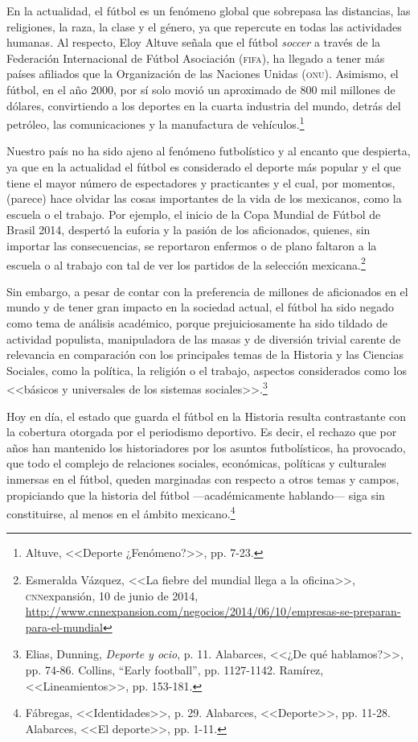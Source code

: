 \documentclass[11pt,a5paper,twoside]{book} %
\begin{document}
\noindent En la actualidad, el fútbol es un fenómeno global que sobrepasa las distancias, las religiones, la raza, la clase y el género, ya que repercute en todas las actividades humanas. Al respecto, Eloy Altuve señala que el fútbol \emph{soccer} a través de la Federación Internacional de Fútbol Asociación (\textsc{fifa}), ha llegado a tener más países afiliados que la Organización de las Naciones Unidas (\textsc{onu}). Asimismo, el fútbol, en el año 2000, por sí solo movió un aproximado de 800 mil millones de dólares, convirtiendo a los deportes en la cuarta industria del mundo, detrás del petróleo, las comunicaciones y la manufactura de vehículos.\footnote{Altuve, <<Deporte ¿Fenómeno?>>, pp. 7-23.}

Nuestro país no ha sido ajeno al fenómeno futbolístico y al encanto que despierta, ya que en la actualidad el fútbol es considerado el deporte más popular y el que tiene el mayor número de espectadores y practicantes y el cual, por momentos, (parece) hace olvidar las cosas importantes de la vida de los mexicanos, como la escuela o el trabajo. Por ejemplo, el inicio de la Copa Mundial de Fútbol de Brasil 2014, despertó la euforia y la pasión de los aficionados, quienes, sin importar las consecuencias, se reportaron enfermos o de plano faltaron a la escuela o al trabajo con tal de ver los partidos de la selección mexicana.\footnote{Esmeralda Vázquez, <<La fiebre del mundial llega a la oficina>>, \textsc{cnn}expansión, 10 de junio de 2014, \url{http://www.cnnexpansion.com/negocios/2014/06/10/empresas-se-preparan-para-el-mundial}}

Sin embargo, a pesar de contar con la preferencia de millones de aficionados en el mundo y de tener gran impacto en la sociedad actual, el fútbol ha sido negado como tema de análisis académico, porque prejuiciosamente ha sido tildado de actividad populista, manipuladora de las masas y de diversión trivial carente de relevancia en comparación con los principales temas de la Historia y las Ciencias Sociales, como la política, la religión o el trabajo, aspectos considerados como los <<básicos y universales de los sistemas sociales>>.\footnote{Elias, Dunning, \emph{Deporte y ocio}, p. 11. Alabarces, <<¿De qué hablamos?>>, pp. 74-86. Collins, ``Early football'',
pp. 1127-1142. Ramírez, <<Lineamientos>>, pp. 153-181.}

Hoy en día, el estado que guarda el fútbol en la Historia resulta contrastante con la cobertura otorgada por el periodismo deportivo. Es decir, el rechazo que por años han mantenido los historiadores por los asuntos futbolísticos, ha provocado, que todo el complejo de relaciones sociales, económicas, políticas y culturales inmersas en el fútbol, queden marginadas con respecto a otros temas y campos, propiciando que la historia del fútbol ---académicamente hablando--- siga sin constituirse, al menos en el ámbito mexicano.\footnote{Fábregas, <<Identidades>>, p. 29. Alabarces, <<Deporte>>, pp. 11-28. Alabarces, <<El deporte>>, pp. 1-11.}
\end{document}
